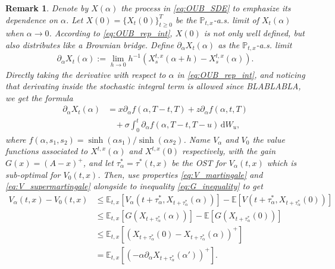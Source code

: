 \documentclass{tufte-handout}
\newcommand{\E}{\mathbb{E}} %
\renewcommand{\Pr}{\mathbb{P}} %
\newcommand{\dif}{\mathrm{d}}
\newtheorem{rmk}{Remark}
\begin{document}
	\begin{rmk}
		Denote by $X(\alpha)$ the process in \eqref{eq:OUB_SDE} to emphasize its dependence on $\alpha$. Let $X(0) = \{X_t(0)\}_{t\geq0}^T$ be the $\Pr_{t, x}$-a.s. limit of $X_t(\alpha)$ when $\alpha\rightarrow 0$. According to \eqref{eq:OUB_rep_int}, $X(0)$ is not only well defined, but also distributes like a Brownian bridge. Define $\partial_\alpha X_t(\alpha)$ as the $\Pr_{t, x}$-a.s. limit
		\begin{align*}
		\partial_\alpha X_t(\alpha) := \lim_{h\rightarrow 0}h^{-1}(X_s^{t, x}(\alpha + h) - X_s^{t, x}(\alpha)).
		\end{align*} 
		Directly taking the derivative with respect to $\alpha$ in \eqref{eq:OUB_rep_int}, and noticing that derivating inside the stochastic integral term is allowed since BLABLABLA, we get the formula
		\begin{align*}
		\partial_\alpha X_{t}(\alpha) &= x\partial_\alpha f(\alpha, T - t, T) + z\partial_\alpha f(\alpha, t, T) \\ &\ \ \ \ + \sigma\int_{0}^{t}\partial_\alpha f(\alpha, T - t, T - u)\,\dif W_u,
		\end{align*}
		where $f(\alpha, s_1, s_2) = \sinh(\alpha s_1)/\sinh(\alpha s_2)$. Name $V_\alpha$ and $V_0$ the value functions associated to $X^{t, x}(\alpha)$ and $X^{t, x}(0)$ respectively, with the gain $G(x) = (A - x)^+$, and let $\tau_\alpha^* = \tau^{*}(t, x)$ be the OST for $V_\alpha(t, x)$ which is sub-optimal for $V_0(t, x)$. Then, use properties \eqref{eq:V_martingale} and \eqref{eq:V_supermartingale} alongside to inequality \eqref{eq:G_inequality} to get
		\begin{align*}
		V_\alpha(t, x) - V_0(t, x) &\leq \E_{t, x}\left[V_\alpha\left(t + \tau_\alpha^*, X_{t + \tau_\alpha^*}(\alpha)\right)\right] - \E\left[V\left(t + \tau_\alpha^*, X_{t + \tau_\alpha^*}(0)\right)\right] \\
		&\leq \E_{t, x}\left[G\left(X_{t + \tau_\alpha^*}(\alpha)\right)\right] - \E\left[G\left(X_{t + \tau_\alpha^*}(0)\right)\right] \\
		&\leq \E_{t, x}\left[\left(X_{t + \tau_\alpha^*}(0) - X_{t + \tau_\alpha^*}(\alpha)\right)^+\right] \\
		&= \E_{t, x}\left[\left(-\alpha\partial_\alpha X_{t + \tau_\alpha^*}(\alpha')\right)^+\right].

\end{align*}
\end{rmk}
\end{document}
